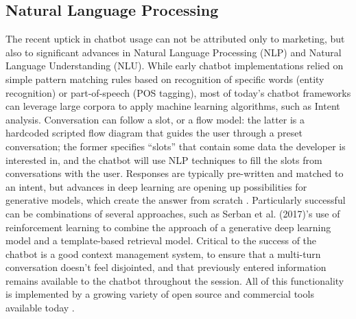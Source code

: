 \subsection{Natural Language Processing}
The recent uptick in chatbot usage can not be attributed only to marketing, but also to significant advances in Natural Language Processing (NLP) and Natural Language Understanding (NLU). 
While early chatbot implementations relied on simple pattern matching rules based on recognition of specific words (entity recognition) or part-of-speech (POS tagging), most of today's chatbot frameworks can leverage large corpora to apply machine learning algorithms, such as Intent analysis. Conversation can follow a slot, or a flow model: the latter is a hardcoded scripted flow diagram that guides the user through a preset conversation; the former specifies ``slots'' that contain some data the developer is interested in, and the chatbot will use NLP techniques to fill the slots from conversations with the user. Responses are typically pre-written and matched to an intent, but advances in deep learning are opening up possibilities for generative models, which create the answer from scratch \cite{Gregori}. Particularly successful can be combinations of several approaches, such as Serban et al. (2017)\cite{Serban2017}'s use of reinforcement learning to combine the approach of a generative deep learning model and a template-based retrieval model. Critical to the success of the chatbot is a good context management system, to ensure that a multi-turn conversation doesn't feel disjointed, and that previously entered information remains available to the chatbot throughout the session. All of this functionality is implemented by a growing variety of open source and commercial tools available today \cite{JavierCouto}.
